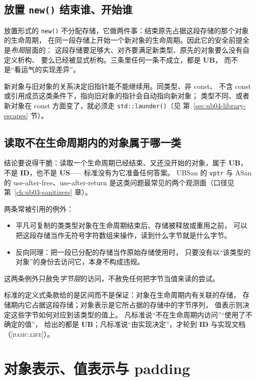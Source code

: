 \documentclass[12pt,a4paper,fontset=fandol]{ctexbook}
\newcommand{\Fn}[1]{\texttt{#1()}}
\newcommand{\Tp}[1]{\texttt{#1}}
\newcommand{\UB}{\textbf{\textsf{UB}}}
\newcommand{\IDB}{\textbf{\textsf{ID}}}
\newcommand{\USB}{\textbf{\textsf{US}}}
\newcommand{\Std}[1]{\textsc{[#1]}}
\begin{document}
\subsection{放置 \Fn{new} 结束谁、开始谁}\label{sec:ub04-placement-new}

放置形式的 \Fn{new} 不分配存储，它做两件事：结束原先占据这段存储的那个对象的生命周期，
在同一段存储上开始一个新对象的生命周期。因此它的安全前提全是\emph{布局}层面的：
这段存储要足够大、对齐要满足新类型、原先的对象要么没有自定义析构、
要么已经被显式析构。三条里任何一条不成立，都是 \UB{}，
而不是“看运气的实现差异”。

新对象与旧对象的关系决定旧指针能不能继续用。同类型、非 const、
不含 const 或引用成员这类条件下，指向旧对象的指针会自动指向新对象；
类型不同、或者新对象在 const 方面变了，就必须走 \Fn{std::launder}（见 第~\ref{sec:ub04-library-escapes} 节）。

\subsection{读取不在生命周期内的对象属于哪一类}\label{sec:ub04-dead-read}

结论要说得干脆：读取一个生命周期已经结束、又还没开始的对象，属于 \UB{}，
不是 \IDB{}，也不是 \USB{}——标准没有为它准备任何答案。
UBSan 的 \Tp{vptr} 与 ASan 的 use-after-free、use-after-return
是这类问题最常见的两个观测面（口径见 第~\ref{ch:ub03-sanitizers} 章）。

两条常被引用的例外：
\begin{itemize}
\item 平凡可复制的类类型对象在生命周期结束后、存储被释放或重用之前，
      可以把这段存储当作无符号字符数组来操作，读到什么字节就是什么字节。
\item 反向同理：把一段已分配的存储当作原始存储使用时，
      只要没有以“该类型的对象”的身份去访问它，本身不构成违规。
\end{itemize}
这两条例外只赦免\emph{字节层}的访问，不赦免任何把字节当值来读的尝试。

\begin{clause}[title={标准怎么说：生命周期与对象表示}]
标准的定义式条款给的是区间而不是保证：对象在生命周期内有关联的存储，
存储期内它占据这段存储；对象表示是它所占据的存储中的字节序列，
值表示则决定这些字节如何对应到该类型的值上。
凡标准说“不在生命周期内访问”“使用了不确定的值”，
给出的都是 \UB{}；凡标准说“由实现决定”，才轮到 \IDB{} 与实现文档（\Std{basic.life}）。
\end{clause}

\section{对象表示、值表示与 padding}\label{sec:ub04-representation}
\end{document}
